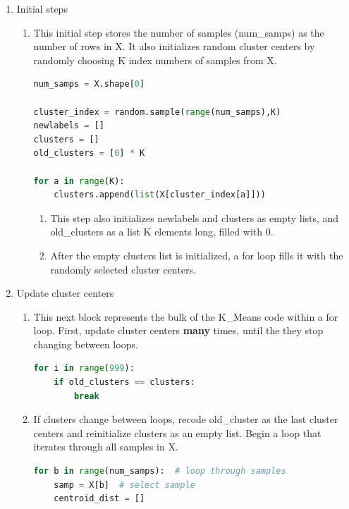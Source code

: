 \documentclass[11pt]{article}
\theoremstyle{definition}
\begin{document}
\begin{enumerate}
    \item Initial steps
        \begin{enumerate}
            \item This initial step stores the number of samples (\textsf{num\_samps}) as the number of rows in \textsf{X}. It also initializes random cluster centers by randomly choosing \textsf{K} index numbers of samples from \textsf{X}.
\begin{lstlisting}[language=python, frame=single]
num_samps = X.shape[0]

cluster_index = random.sample(range(num_samps),K)
newlabels = []
clusters = []
old_clusters = [0] * K

for a in range(K):
    clusters.append(list(X[cluster_index[a]]))
\end{lstlisting}
    \begin{enumerate}
        \item This step also initializes \textsf{newlabels} and \textsf{clusters} as empty lists, and \textsf{old\_clusters} as a list \textsf{K} elements long, filled with 0.
        \item After the empty \textsf{clusters} list is initialized, a for loop fills it with the randomly selected cluster centers.
    \end{enumerate}
    \end{enumerate}
    \item Update cluster centers
    \begin{enumerate}
        \item This next block represents the bulk of the \textsf{K\_Means} code within a for loop. First, update cluster centers \textbf{many} times, until the they stop changing between loops.
\begin{lstlisting}[language=python, frame=single]
for i in range(999): 
    if old_clusters == clusters:
        break
\end{lstlisting}
        \item If clusters change between loops, recode \textsf{old\_cluster} as the last cluster centers and reinitialize \textsf{clusters} as an empty list. Begin a loop that iterates through all samples in \textsf{X}. 
\begin{lstlisting}[language=python, frame=single]
for b in range(num_samps):  # loop through samples
    samp = X[b]  # select sample
    centroid_dist = []
\end{lstlisting}
            \begin{enumerate}

\end{enumerate}
\end{enumerate}
\end{enumerate}
\end{document}
